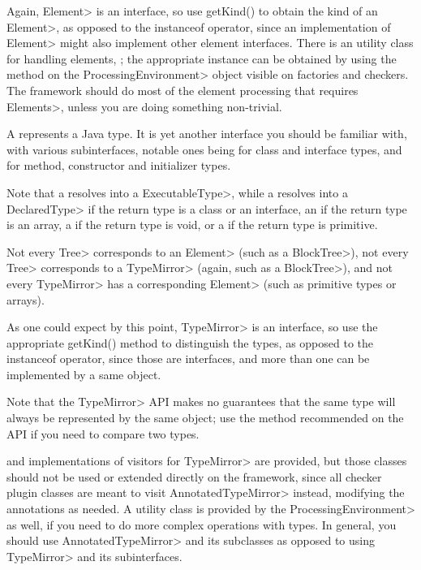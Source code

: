 Again, \<Element> is an interface, so use getKind() to obtain the kind
of an \<Element>, as opposed to the instanceof operator, since an
implementation of \<Element> might also implement other element
interfaces. There is an utility class for handling elements,
;
the appropriate instance can be obtained by using the
method on the \<ProcessingEnvironment> object visible on factories and
checkers. The framework should do most of the element processing that
requires \<Elements>, unless you are doing something non-trivial.

A
represents a Java type. It is yet another interface you should be
familiar with, with various subinterfaces, notable ones being
for class and interface types, and
for method, constructor and initializer types.

Note that a
resolves into a \<ExecutableType>, while a
resolves into a \<DeclaredType> if the return type is a class or an
interface, an
if the return type is an array, a
if the return type is void, or a
if the return type is primitive.

Not every \<Tree> corresponds to an \<Element> (such as a
\<BlockTree>), not every \<Tree> corresponds to a \<TypeMirror>
(again, such as a \<BlockTree>), and not every \<TypeMirror> has a
corresponding \<Element> (such as primitive types or arrays).

As one could expect by this point, \<TypeMirror> is an interface, so
use the appropriate getKind() method to distinguish the types, as
opposed to the instanceof operator, since those are interfaces, and
more than one can be implemented by a same object.

Note that the \<TypeMirror> API makes no guarantees that the same type
will always be represented by the same object; use the method
recommended on the API if you need to compare two types.

and implementations of visitors for \<TypeMirror> are provided, but
those classes should not be used or extended directly on the
framework, since all checker plugin classes are meant to visit
\<AnnotatedTypeMirror> instead, modifying the annotations as needed.
A
utility class is provided by the \<ProcessingEnvironment> as well, if
you need to do more complex operations with types. In general, you
should use \<AnnotatedTypeMirror> and its subclasses as opposed to
using \<TypeMirror> and its subinterfaces.

